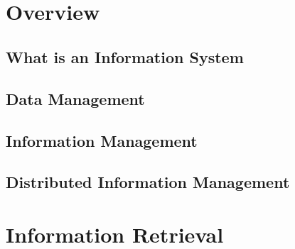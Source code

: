 \documentclass[a4paper]{article}
\title{\vspace{-.25cm} \HWTitle \\ \vspace{.25cm}}
\author{\HWAuthorName}
\begin{document}
\maketitle

\section{Overview} %
  \label{sec:distributed_information_systems_overview}

  \subsection{What is an Information System} %
  \label{sub:what_is_an_information_system}
    

  \subsection{Data Management} %
  \label{sub:data_management}
    

  \subsection{Information Management} %
  \label{sub:information_management}
    

  \subsection{Distributed Information Management} %
  \label{sub:distributed_information_management}
    

\section{Information Retrieval} %
\label{sec:information_retrieval_vector_space_retrieval}
  
  
  
\end{document}
